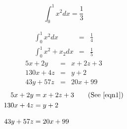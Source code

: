 \documentclass{book}
\begin{document}
\begin{equation}
	\int_{0}^{1} x^2 dx = \frac{1}{3}
\end{equation}

\begin{eqnarray}
    \int_{0}^{1} x^2 dx &=& \frac{1}{4} \label{eqn12} \\
    \int_{0}^{1} x^2+x_2 dx &=& \frac{1}{5}
\end{eqnarray}
\begin{eqnarray}
	5x+2y &=& x+2z+3 \label{eqn1}\\
	130x+4z &=& y+2 \nonumber \\
	43y+57z &=& 20x+99 \label{eqn3}
\end{eqnarray}
\begin{align}
	5x+2y   & = x+2z+3 \tag{See \eqref{eqn1}} \\
	130x+4z & = y+2 \label{align2}            \\[3mm]
	43y+57z & = 20x+99 \notag
\end{align}
\end{document}
